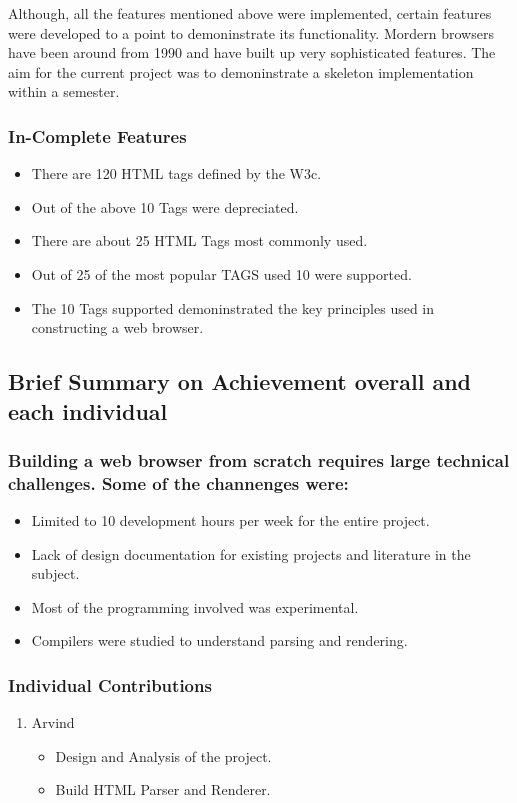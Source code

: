 \documentclass[11pt]{article}
\begin{document}
Although, all the features mentioned above were implemented, certain features were developed to a point to demoninstrate its functionality. Mordern browsers have been around from 1990 and have built up very sophisticated features. The aim for the current project was to demoninstrate a skeleton implementation within a semester. 

\subsubsection{In-Complete Features}
\label{sec-1-3-2}
\begin{itemize}
\item There are 120 HTML tags defined by the W3c.
\item Out of the above 10 Tags were depreciated.
\item There are about 25 HTML Tags most commonly used.
\item Out of 25 of the most popular TAGS used 10 were supported.
\item The 10 Tags supported demoninstrated the key principles used in constructing a web browser.
\end{itemize}

\subsection{Brief Summary on Achievement overall and each individual}
\label{sec-1-4}
\subsubsection{Building a web browser from scratch requires large technical challenges. Some of the channenges were:}
\label{sec-1-4-1}
\begin{itemize}
\item Limited to 10 development hours per week for the entire project.
\item Lack of design documentation for existing projects and literature in the subject.
\item Most of the programming involved was experimental.
\item Compilers were studied to understand parsing and rendering.
\end{itemize}
\subsubsection{Individual Contributions}
\label{sec-1-4-2}
\begin{enumerate}
\item Arvind
\label{sec-1-4-2-1}
\begin{itemize}
\item Design and Analysis of the project.
\item Build HTML Parser and Renderer.
\end{itemize}
\end{enumerate}
\end{document}

